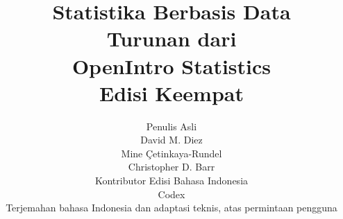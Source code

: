 

\title{\huge Statistika Berbasis Data \\[2mm]
\large Turunan dari \\
OpenIntro Statistics \\
Edisi Keempat}
\author{\Large Penulis Asli \\[1.5mm]
\normalsize David M. Diez \\
\normalsize Mine \c{C}etinkaya-Rundel \\
\normalsize Christopher D. Barr \\[8mm]
\Large Kontributor Edisi Bahasa Indonesia \\[1.5mm]
\normalsize Codex \\
\small Terjemahan bahasa Indonesia dan adaptasi teknis, atas permintaan pengguna \\[2mm]
}
